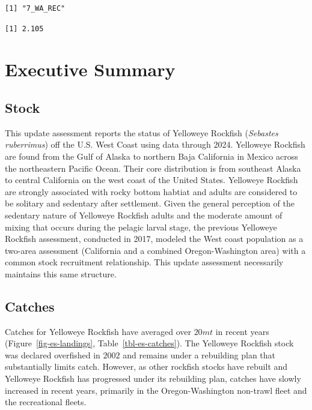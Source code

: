 \documentclass[
]{scrartcl}
\begin{document}
\begin{verbatim}
[1] "7_WA_REC"
\end{verbatim}

\begin{verbatim}
[1] 2.105
\end{verbatim}

\newpage{}


\section*{Executive Summary}\label{executive-summary}

\subsection*{Stock}\label{stock}

This update assessment reports the status of Yelloweye Rockfish
(\emph{Sebastes ruberrimus}) off the U.S. West Coast using data through
2024. Yelloweye Rockfish are found from the Gulf of Alaska to northern
Baja California in Mexico across the northeastern Pacific Ocean. Their
core distribution is from southeast Alaska to central California on the
west coast of the United States. Yelloweye Rockfish are strongly
associated with rocky bottom habtiat and adults are considered to be
solitary and sedentary after settlement. Given the general perception of
the sedentary nature of Yelloweye Rockfish adults and the moderate
amount of mixing that occurs during the pelagic larval stage, the
previous Yelloweye Rockfish assessment, conducted in 2017, modeled the
West coast population as a two-area assessment (California and a
combined Oregon-Washington area) with a common stock recruitment
relationship. This update assessment necessarily maintains this same
structure.

\subsection*{Catches}\label{catches}

Catches for Yelloweye Rockfish have averaged over \(20 mt\) in recent
years (Figure~\ref{fig-es-landings}, Table~\ref{tbl-es-catches}). The
Yelloweye Rockfish stock was declared overfished in \(2002\) and remains
under a rebuilding plan that substantially limits catch. However, as
other rockfish stocks have rebuilt and Yelloweye Rockfish has progressed
under its rebuilding plan, catches have slowly increased in recent
years, primarily in the Oregon-Washington non-trawl fleet and the
recreational fleets.
\end{document}
